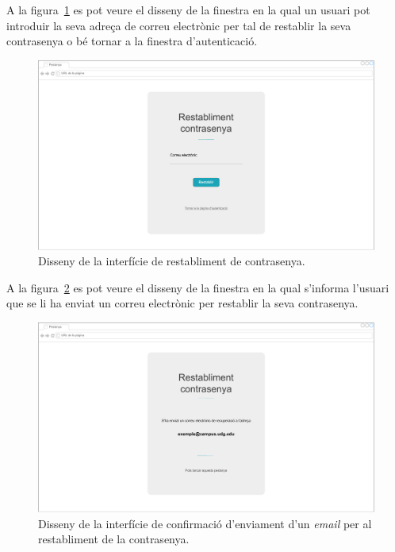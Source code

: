 \documentclass[a4paper,12pt]{ThesisStyle}
\begin{document}
A la figura~\ref{img:passwordRestablishment} es pot veure el disseny de la finestra en la qual un usuari pot introduir la seva adreça de correu electrònic per tal de restablir la seva contrasenya o bé tornar a la finestra d'autenticació.
\begin{figure}[H]
	\centering
	\includegraphics[width=\textwidth]{assets/interfaces/auth/passwordRestablishment.pdf}
	\caption{\label{img:passwordRestablishment}Disseny de la interfície de restabliment de contrasenya.}
\end{figure}

A la figura~\ref{img:passwordRestablished} es pot veure el disseny de la finestra en la qual s'informa l'usuari que se li ha enviat un correu electrònic per restablir la seva contrasenya.
\begin{figure}[H]
	\centering
	\includegraphics[width=\textwidth]{assets/interfaces/auth/passwordRestablished.pdf}
	\caption{\label{img:passwordRestablished}Disseny de la interfície de confirmació d'enviament d'un \textit{email} per al restabliment de la contrasenya.}
\end{figure}
\end{document}

